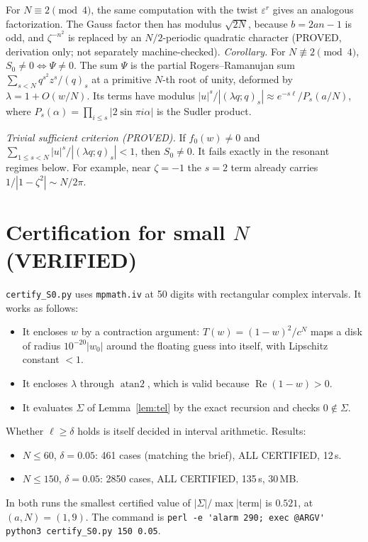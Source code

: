 \documentclass[11pt]{article}
\theoremstyle{remark}\newtheorem{remark}[lemma]{Remark}
\begin{document}
For $N\equiv2\pmod4$, the same computation with the twist $\varepsilon^r$ gives an analogous factorization. The Gauss factor then has modulus $\sqrt{2N}$, because $b=2an-1$ is odd, and $\zeta^{-n^2}$ is replaced by an $N/2$-periodic quadratic character (PROVED, derivation only; not separately machine-checked).
\emph{Corollary.} For $N\not\equiv2\pmod4$, $S_0\ne0\iff\Psi\ne0$. The sum $\Psi$ is the partial Rogers--Ramanujan sum $\sum_{s<N}q^{s^2}z^s/(q)_s$ at a primitive $N$-th root of unity, deformed by $\lambda=1+O(w/N)$. Its terms have modulus $|u|^s/|(\lambda q;q)_s|\approx e^{-s\ell}/P_s(a/N)$, where $P_s(\alpha)=\prod_{i\le s}|2\sin\pi i\alpha|$ is the Sudler product.

\emph{Trivial sufficient criterion (PROVED).} If $f_0(w)\ne0$ and $\sum_{1\le s<N}|u|^s/|(\lambda q;q)_s|<1$, then $S_0\ne0$. It fails exactly in the resonant regimes below. For example, near $\zeta=-1$ the $s=2$ term already carries $1/|1-\zeta^2|\sim N/2\pi$.

\section{Certification for small $N$ (VERIFIED)}
\texttt{certify\_S0.py} uses \texttt{mpmath.iv} at 50 digits with rectangular complex intervals. It works as follows:
\begin{itemize}
\item It encloses $w$ by a contraction argument: $T(w)=(1-w)^2/c^N$ maps a disk of radius $10^{-20}|w_0|$ around the floating guess into itself, with Lipschitz constant $<1$.
\item It encloses $\lambda$ through $\operatorname{atan2}$, which is valid because $\operatorname{Re}(1-w)>0$.
\item It evaluates $\Sigma$ of Lemma~\ref{lem:tel} by the exact recursion and checks $0\notin\Sigma$.
\end{itemize}
Whether $\ell\ge\delta$ holds is itself decided in interval arithmetic.
Results:
\begin{itemize}
\item $N\le60$, $\delta=0.05$: 461 cases (matching the brief), ALL CERTIFIED, 12\,s.
\item $N\le150$, $\delta=0.05$: 2850 cases, ALL CERTIFIED, 135\,s, 30\,MB.
\end{itemize}
In both runs the smallest certified value of $|\Sigma|/\max|\text{term}|$ is $0.521$, at $(a,N)=(1,9)$.
The command is \verb|perl -e 'alarm 290; exec @ARGV' python3 certify_S0.py 150 0.05|.
\end{document}
